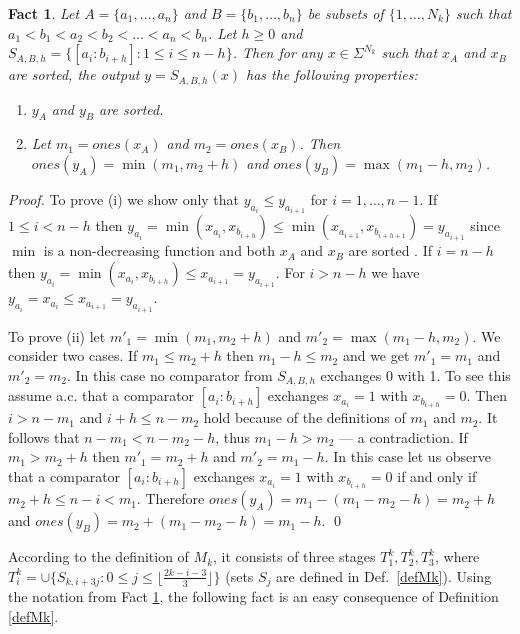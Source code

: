 \documentclass{llncs}
\newtheorem{fact}[theorem]{Fact}
\begin{document}
\begin{fact}\label{f33}
Let $A=\{a_1,\ldots,a_n\}$ and $B=\{b_1,\ldots,b_n\}$ be subsets of
$\{1,\ldots,N_k\}$ such that $a_1 < b_1 < a_2 < b_2 < \ldots < a_n <
b_n$. Let $h\ge 0$ and $S_{A,B,h}=\{[a_i:b_{i+h}]: 1\le i \le
n-h\}$. Then for any $x\in\Sigma^{N_k}$ such that $x_A$ and $x_B$
are sorted, the output $y=S_{A,B,h}(x)$ has the following properties:
\begin{enumerate}
\item[(i)] $y_A$ and $y_B$ are sorted.
\item[(ii)] Let $m_1=ones(x_A)$ and $m_2=ones(x_B)$. Then $ones(y_A) =
  \min(m_1,m_2+h)$ and $ones(y_B) = \max(m_1-h,m_2)$.
\end{enumerate}
\end{fact}
\begin{proof}
To prove (i) we show only that $y_{a_i}\le y_{a_{i+1}}$ for
$i=1,\ldots,n-1$. If $1\le i<n-h$ then $y_{a_i} =
\min(x_{a_i},x_{b_{i+h}}) \le \min(x_{a_{i+1}},x_{b_{i+h+1}}) =
y_{a_{i+1}}$ since $\min$ is a non-decreasing function and both $x_A$
and $x_B$ are sorted . If $i=n-h$ then $y_{a_i} =
\min(x_{a_i},x_{b_{i+h}}) \le x_{a_{i+1}} = y_{a_{i+1}}$. For $i>n-h$
we have $y_{a_i} = x_{a_i} \le x_{a_{i+1}} = y_{a_{i+1}}$.

To prove (ii) let $m'_1=\min(m_1,m_2+h)$ and $m'_2=\max(m_1-h,m_2)$.
We consider two cases. If $m_1\le m_2+h$ then $m_1-h\le m_2$ and we
get $m'_1=m_1$ and $m'_2=m_2$. In this case no comparator from
$S_{A,B,h}$ exchanges 0 with 1. To see this assume a.c. that a
comparator $[a_i:b_{i+h}]$ exchanges $x_{a_i}=1$ with
$x_{b_{i+h}}=0$. Then $i>n-m_1$ and $i+h\le n-m_2$ hold because of the
definitions of $m_1$ and $m_2$. It follows that $n-m_1 < n-m_2-h$,
thus $m_1-h > m_2$ --- a contradiction. If $m_1 > m_2+h$ then $m'_1 =
m_2+h$ and $m'_2=m_1-h$. In this case let us observe that a comparator
$[a_i:b_{i+h}]$ exchanges $x_{a_i}=1$ with $x_{b_{i+h}}=0$ if and only
if $m_2+h \le n-i < m_1$. Therefore $ones(y_A) = m_1-(m_1-m_2-h) =
m_2+h$ and $ones(y_B) = m_2+(m_1-m_2-h) = m_1-h$. \qed
\end{proof}
According to the definition of $M_k$, it consists of three stages $T^k_1,
T^k_2, T^k_3$, where $T^k_i = \cup\{S_{k,i+3j}: 0 \le j\le \lfloor
\frac{2k-i-3}{3} \rfloor\}$ (sets $S_j$ are defined in Def.~\ref{defMk}). 
Using the notation from Fact \ref{f33}, the following fact is an easy
consequence of Definition \ref{defMk}.
\end{document}
